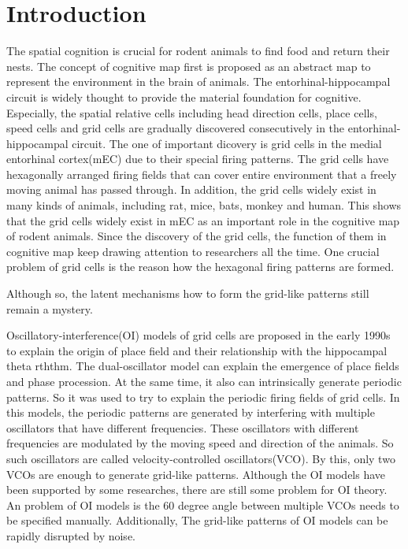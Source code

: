 \documentclass[final,5p,times,twocolumn]{elsarticle}
\begin{document}
\section{Introduction}
The spatial cognition is crucial for rodent animals to find food and return their nests. The concept of cognitive map first is proposed as an abstract map to represent the environment in the brain of animals\citep{Tolman1948}. The entorhinal-hippocampal circuit is widely thought to provide the material foundation for cognitive\citep{McNaughton2006}. Especially, the spatial relative cells including head direction cells, place cells, speed cells and grid cells are gradually discovered consecutively in the entorhinal-hippocampal circuit. The one of important dicovery is grid cells in the medial entorhinal cortex(mEC)\citep{Moser2017} due to their special firing patterns. The grid cells have hexagonally arranged firing fields that can cover entire environment that a freely moving animal has passed through\citep{Rowland2016}. In addition, the grid cells widely exist in many kinds of animals, including rat, mice\citep{Fyhn2008}, bats\citep{Yartsev2011}, monkey\citep{Killian2012} and human\citep{Jacobs2013,Kunz2015,Doeller2010}. This shows that the grid cells widely exist in mEC as an important role in the cognitive map of rodent animals. Since the discovery of the grid cells, the function of them in cognitive map keep drawing attention to researchers all the time. One crucial problem of grid cells is the reason how the hexagonal firing patterns are formed. 




Although so, the latent mechanisms how to form the grid-like patterns still remain a mystery\citep{DAlbis2017}.


Oscillatory-interference(OI) models of grid cells are proposed in the early 1990s to explain the origin of place field and their relationship with the hippocampal theta rththm\citep{OKeefe2005,Burgess2007,Hasselmo2007,Pastoll2013,Burgess2008}. The dual-oscillator model can explain the emergence of place fields and phase procession\citep{OKeefe2005}. At the same time, it also can intrinsically generate periodic patterns. So it was used to try to explain the periodic firing fields of grid cells\citep{DAlbis2018}. In this models, the periodic patterns are generated by interfering with multiple oscillators that have different frequencies. These oscillators with different frequencies are modulated by the moving speed and direction of the animals. So such oscillators are called velocity-controlled oscillators(VCO). By this, only two VCOs are enough to generate grid-like patterns. 
Although the OI models have been supported by some researches\citep{Schmidt-Hieber2013,Domnisoru2013,Welday2011,Koenig2011,Brandon2011,Giocomo2007,Hafting2005,Alonso1989}, there are still some problem for OI theory. An problem of OI models is the 60 degree angle between multiple VCOs needs to be specified manually. Additionally, The grid-like patterns of OI models can be rapidly disrupted by noise\citep{DAlbis2018}.
\end{document}
